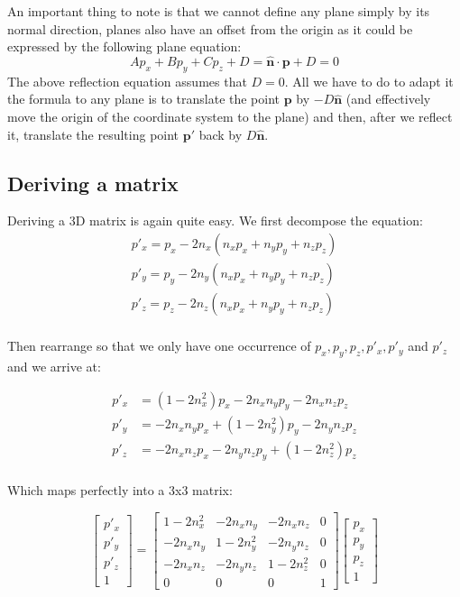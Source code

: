 \documentclass[]{report}   %
\begin{document}
An important thing to note is that we cannot define any plane simply by its normal direction, planes also have an offset from the origin as it could be expressed by the following plane equation:
\[
	A p_x + B p_y + C p_z + D = \mathbf{\hat{n}} \cdot \mathbf{p} + D = 0
\]
The above reflection equation assumes that \(D=0\). All we have to do to adapt it the formula to any plane is to translate the point \(\mathbf{p}\) by \(-D\mathbf{\hat{n}}\) (and effectively move the origin of the coordinate system to the plane) and then, after we reflect it, translate the resulting point \(\mathbf{p\prime}\) back by \(D\mathbf{\hat{n}}\).

\subsection{Deriving a matrix}
Deriving a 3D matrix is again quite easy. We first decompose the equation:
\begin{align*}
	p\prime_x = p_x - 2n_x(n_x p_x + n_y p_y + n_z p_z)		\\
	p\prime_y = p_y - 2n_y(n_x p_x + n_y p_y + n_z p_z)		\\
	p\prime_z = p_z - 2n_z(n_x p_x + n_y p_y + n_z p_z)		\\
\end{align*}

Then rearrange so that we only have one occurrence of \(p_x, p_y, p_z, p\prime_x, p\prime_y\) and \(p\prime_z\)and we arrive at:

\begin{align*}
	p\prime_x &= (1 - 2n_x^2)p_x -2n_x n_y p_y -2n_x n_z p_z	\\
	p\prime_y &= -2n_x n_y p_x + (1 - 2n_y^2)p_y -2n_y n_z p_z	\\
	p\prime_z &= -2n_x n_z p_x -2n_y n_z p_y + (1 - 2n_z^2)p_z	\\
\end{align*}

Which maps perfectly into a 3x3 matrix:

\[
	\begin{bmatrix}
	p\prime_x \\
	p\prime_y \\
	p\prime_z \\
	1
	\end{bmatrix}
	=	
	\begin{bmatrix}
		1 - 2n_x^2	&	-2n_x n_y	&	-2n_x n_z	&	0 \\
		-2n_x n_y	&	1 - 2n_y^2	& 	-2n_y n_z	&	0 \\
		-2n_x n_z	&	-2n_y n_z	&	1 - 2n_z^2	&	0 \\
		0 			&		0 		& 		0 		&	1
	\end{bmatrix}
	\begin{bmatrix}
		p_x \\
		p_y \\
		p_z \\
		1
	\end{bmatrix}
\]
\end{document}
